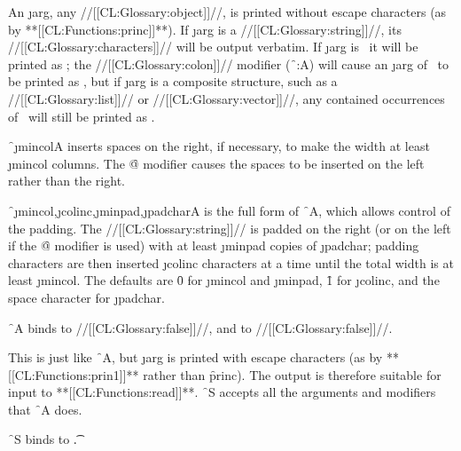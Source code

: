 An \j{arg}, any //[[CL:Glossary:object]]//,  is printed without escape characters (as by **[[CL:Functions:princ]]**).  If \j{arg} is a //[[CL:Glossary:string]]//,  its //[[CL:Glossary:characters]]// will be output verbatim. If \j{arg} is \nil\ it will be printed as \nil; the //[[CL:Glossary:colon]]// modifier (\f{~:A}) will cause an \j{arg} of \nil\ to be printed as \empty, but if \j{arg} is a composite structure, such as a //[[CL:Glossary:list]]// or //[[CL:Glossary:vector]]//, any contained occurrences of \nil\ will still be printed as \nil.

\f{~\j{mincol}A} inserts spaces on the right, if necessary, to make the width at least \j{mincol} columns.  The \f{@} modifier causes the spaces to be inserted on the left rather than the right.

\f{~\j{mincol},\j{colinc},\j{minpad},\j{padchar}A}  is the full form of \f{~A}, which allows control of the padding. The //[[CL:Glossary:string]]// is padded on the right (or on the left if the \f{@} modifier is used) with at least \j{minpad} copies of \j{padchar}; padding characters are then inserted \j{colinc} characters at a time until the total width is at least \j{mincol}. The defaults are \f{0} for \j{mincol} and \j{minpad}, \f{1} for \j{colinc}, and the space character for \j{padchar}.

 \f{~A} binds  to //[[CL:Glossary:false]]//,  and  to //[[CL:Glossary:false]]//.

\endsubsubsection%

 

This is just like \f{~A}, but \j{arg} is printed with escape characters (as by **[[CL:Functions:prin1]]** rather than \f{princ}).  The output is therefore suitable for input to **[[CL:Functions:read]]**.  \f{~S} accepts all the arguments and modifiers that \f{~A} does.

 \f{~S} binds  to \t.

\endsubsubsection%

  

